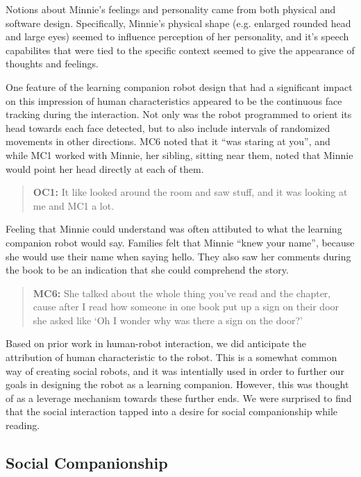 \documentclass{sigchi}
\begin{document}
Notions about Minnie's feelings and personality came from both physical and software design. Specifically, Minnie's physical shape (e.g. enlarged rounded head and large eyes) seemed to influence perception of her personality, and it's speech capabilites that were tied to the specific context seemed to give the appearance of thoughts and feelings. 

One feature of the learning companion robot design that had a significant impact on this impression of human characteristics appeared to be the continuous face tracking during the interaction. Not only was the robot programmed to orient its head towards each face detected, but to also include intervals of randomized movements in other directions. MC6 noted that it ``was staring at you'', and while MC1 worked with Minnie, her sibling, sitting near them, noted that Minnie would point her head directly at each of them.

	 \begin{quote}
	 	 \textbf{OC1:} It like looked around the room and saw stuff, and it was looking at me and MC1 a lot.
	 \end{quote}
	
Feeling that Minnie could understand was often attibuted to what the learning companion robot would say. Families felt that Minnie ``knew your name'', because she would use their name when saying hello. They also saw her comments during the book to be an indication that she could comprehend the story.

	\begin{quote}
		\textbf{MC6:} She talked about the whole thing you've read and the chapter, cause after I read how someone in one book put up a sign on their door she asked like `Oh I wonder why was there a sign on the door?'
	\end{quote} 

Based on prior work in human-robot interaction, we did anticipate the attribution of human characteristic to the robot.  This is a somewhat common way of creating social robots, and it was intentially used in order to further our goals in designing the robot as a learning companion.  However, this was thought of as a leverage mechanism towards these further ends.  We were surprised to find that the social interaction tapped into a desire for social companionship while reading.

\subsection{Social Companionship}
\end{document}

